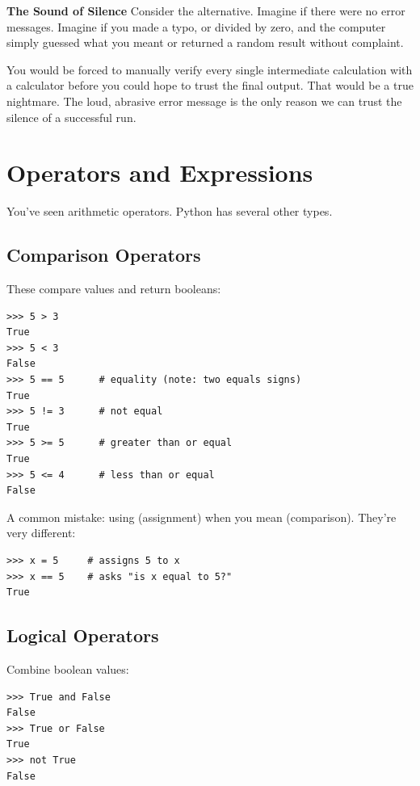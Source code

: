 \begin{ponder}
\textbf{The Sound of Silence}
Consider the alternative. Imagine if there were no error messages. Imagine if you made a typo, or divided by zero, and the computer simply guessed what you meant or returned a random result without complaint.

You would be forced to manually verify every single intermediate calculation with a calculator before you could hope to trust the final output. That would be a true nightmare. The loud, abrasive error message is the only reason we can trust the silence of a successful run.
\end{ponder}

\section{Operators and Expressions}
\label{sec:operators}

You've seen arithmetic operators. Python has several other types.

\subsection{Comparison Operators}

These compare values and return booleans:

\begin{lstlisting}
>>> 5 > 3
True
>>> 5 < 3
False
>>> 5 == 5      # equality (note: two equals signs)
True
>>> 5 != 3      # not equal
True
>>> 5 >= 5      # greater than or equal
True
>>> 5 <= 4      # less than or equal
False
\end{lstlisting}

\begin{warning}
A common mistake: using \py{=} (assignment) when you mean \py{==} (comparison). They're very different:
\begin{lstlisting}
>>> x = 5     # assigns 5 to x
>>> x == 5    # asks "is x equal to 5?"
True
\end{lstlisting}
\end{warning}

\subsection{Logical Operators}

Combine boolean values:

\begin{lstlisting}
>>> True and False
False
>>> True or False
True
>>> not True
False
\end{lstlisting}

